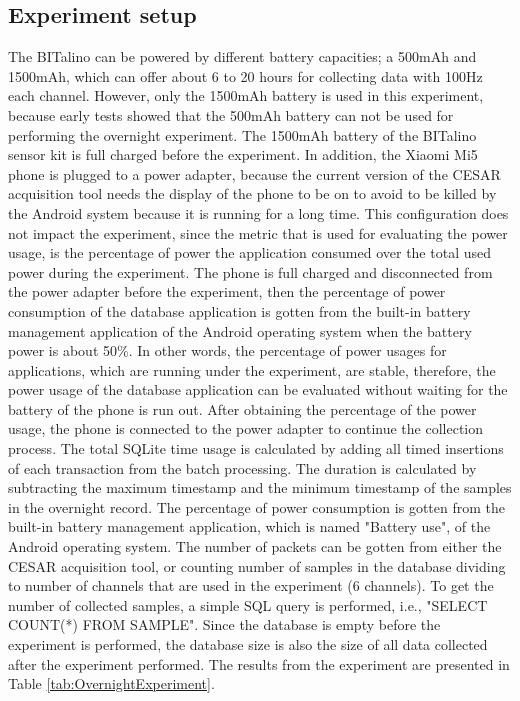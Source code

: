 \subsection{Experiment setup}
The BITalino can be powered by different battery capacities; a 500mAh and 1500mAh, which can offer about 6 to 20 hours for collecting data with 100Hz each channel. However, only the 1500mAh battery is used in this experiment, because early tests showed that the 500mAh battery can not be used for performing the overnight experiment. The 1500mAh battery of the BITalino sensor kit is full charged before the experiment. In addition, the Xiaomi Mi5 phone is plugged to a power adapter, because the current version of the CESAR acquisition tool needs the display of the phone to be on to avoid to be killed by the Android system because it is running for a long time. This configuration does not impact the experiment, since the metric that is used for evaluating the power usage, is the percentage of power the application consumed over the total used power during the experiment. The phone is full charged and disconnected from the power adapter before the experiment, then the percentage of power consumption of the database application is gotten from the built-in battery management application of the Android operating system when the battery power is about 50\%. In other words, the percentage of power usages for applications, which are running under the experiment, are stable, therefore, the power usage of the database application can be evaluated without waiting for the battery of the phone is run out. After obtaining the percentage of the power usage, the phone is connected to the power adapter to continue the collection process. The total SQLite time usage is calculated by adding all timed insertions of each transaction from the batch processing. The duration is calculated by subtracting the maximum timestamp and the minimum timestamp of the samples in the overnight record. The percentage of power consumption is gotten from the built-in battery management application, which is named "Battery use", of the Android operating system. The number of packets can be gotten from either the CESAR acquisition tool, or counting number of samples in the database dividing to number of channels that are used in the experiment (6 channels). To get the number of collected samples, a simple SQL query is performed, i.e., "SELECT COUNT(*) FROM SAMPLE". Since the database is empty before the experiment is performed, the database size is also the size of all data collected after the experiment performed. The results from the experiment are presented in Table \ref{tab:OvernightExperiment}.
